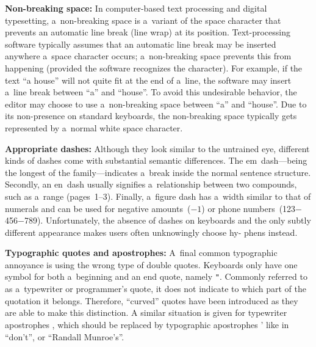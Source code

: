 \documentclass{acm_proc_article-sp}
\begin{document}
\textbf{Non-breaking space:} In computer-based text processing and digital typesetting,
a~non-breaking space is a~variant of the space character that prevents an automatic line break (line wrap) at its position.
Text-processing software typically assumes that an automatic line break may be inserted anywhere a~space
character occurs;
a~non-breaking space prevents this from happening (provided the software recognizes the character).
For example, if the text ``a house'' will not quite fit at the end of a~line,
the software may insert a~line break between ``a'' and ``house''.
To avoid this undesirable behavior, the editor may choose to use a~non-breaking space between ``a'' and ``house''.
Due to its non-presence on standard keyboards,
the non-breaking space typically gets represented by a~normal white space character.

\textbf{Appropriate dashes:} Although they look similar to the untrained eye, different kinds of dashes come with\linebreak%
substantial semantic differences.
The em~dash---being the longest of the family---indicates a~break inside the normal sentence structure.
Secondly, an en~dash usually signifies\linebreak%
a~relationship between two compounds, such as a~range (pages~1--3).
Finally, a~figure dash has a~width similar to that of numerals and can be used for negative amounts~($-1$) or phone numbers~(123$-$456$-$789).
Unfortunately, the\linebreak%
absence of dashes on keyboards and the only subtly different\linebreak%
appearance makes users often unknowingly choose hy-\linebreak%
phens instead.

\textbf{Typographic quotes and apostrophes:} A~final common typographic annoyance is using the wrong type of double quotes.
Keyboards only have one symbol for both a~beginning and an end quote, namely \Verb!"!.
Commonly referred to as a~typewriter or programmer's quote, it does not indicate to which part of the quotation it belongs.
Therefore, ``curved'' quotes have been introduced as they are able to make this distinction.
A similar situation is given for typewriter apostrophes \textquotesingle, which should be replaced by typographic apostrophes ' like in ``don't'', or ``Randall Munroe's''.
\end{document}
